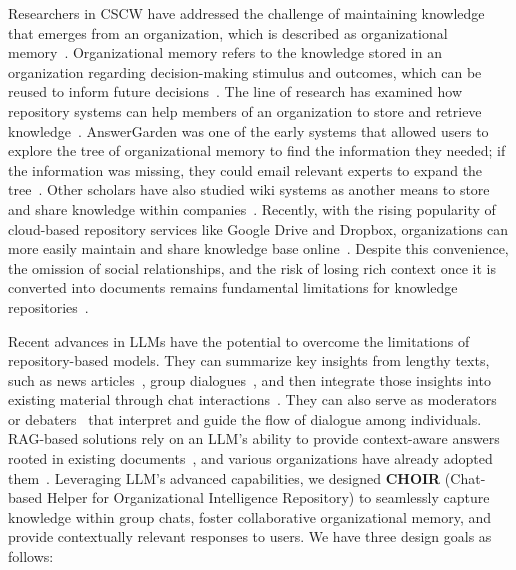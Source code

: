 \documentclass[sigconf,screen]{acmart}
\begin{document}
Researchers in CSCW have addressed the challenge of maintaining knowledge that emerges from an organization, which is described as organizational memory~\cite{ackerman2004organizational, ackerman2013sharing}. Organizational memory refers to the knowledge stored in an organization regarding decision-making stimulus and outcomes, which can be reused to inform future decisions~\cite{walsh2009organizational}. The line of research has examined how repository systems can help members of an organization to store and retrieve knowledge~\cite{ackerman1990answer, stein1995actualizing, burke1997question, pipek2003pruning, halverson2004behind, schaffert2006ikewiki, grudin2010wikis}. AnswerGarden was one of the early systems that allowed users to explore the tree of organizational memory to find the information they needed; if the information was missing, they could email relevant experts to expand the tree~\cite{ackerman1990answer}. Other scholars have also studied wiki systems as another means to store and share knowledge within companies~\cite{schaffert2006ikewiki,grudin2010wikis}. Recently, with the rising popularity of cloud-based repository services like Google Drive and Dropbox, organizations can more easily maintain and share knowledge base online~\cite{saratchandra2022role}. Despite this convenience, the omission of social relationships, and the risk of losing rich context once it is converted into documents remains fundamental limitations for knowledge repositories~\cite{ackerman2013sharing}.

Recent advances in LLMs have the potential to overcome the limitations of repository-based models. They can summarize key insights from lengthy texts, such as news articles~\cite{zhang2024benchmarking}, group dialogues~\cite{asthana2023summaries, tian2024dialogue}, and then integrate those insights into existing material through chat interactions~\cite{laban2024beyond}. They can also serve as moderators~\cite{bhatia2024moderating} or debaters~\cite{chiang2024enhancing} that interpret and guide the flow of dialogue among individuals. RAG-based solutions rely on an LLM's ability to provide context-aware answers rooted in existing documents~\cite{lewis2020retrieval}, and various organizations have already adopted them~\cite{khangarotCouncilPostRAG}. Leveraging LLM's advanced capabilities, we designed \textbf{CHOIR} (Chat-based Helper for Organizational Intelligence Repository) to seamlessly capture knowledge within group chats, foster collaborative organizational memory, and provide contextually relevant responses to users. We have three design goals as follows: 
\end{document}
